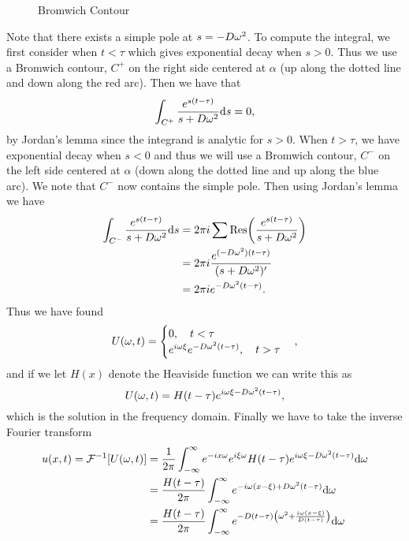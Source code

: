 \documentclass[12pt]{report}
\begin{document}
\begin{solution}
\begin{enumerate}
\begin{figure}[H]
            \caption{Bromwich Contour}
        \end{figure}
        Note that there exists a simple pole at $s = - D{\omega}^2$. To compute the integral, we first consider when $t < \tau$ which gives exponential decay when $s > 0$. Thus we use a Bromwich contour, $C^+$ on the right side centered at $\alpha$ (up along the dotted line and down along the red arc). Then we have that
        \[ 
            \int_{C^+}  \frac{e^{s(t - \tau)}}{s + D{\omega}^2} {\mathrm{d}} s = 0,
        \]
        by Jordan's lemma since the integrand is analytic for $s>0$. When $t > \tau$, we have exponential decay when $s < 0$ and thus we will use a Bromwich contour, $C^-$ on the left side centered at $\alpha$ (down along the dotted line and up along the blue arc). We note that $C^-$ now contains the simple pole. Then using Jordan's lemma we have
        \begin{align*}
            \int_{C^-}  \frac{e^{s(t - \tau)}}{s + D{\omega}^2} {\mathrm{d}} s &= 2\pi i \sum \text{Res} {\left(\frac{e^{s(t - \tau)}}{s + D{\omega}^2}\right)}\\
            &= 2 \pi i \frac{e^{(-D{\omega}^2)(t - \tau)}}{(s + D {\omega}^2)'}\\
            &= 2 \pi i e^{-D{\omega}^2(t - \tau)}.
        \end{align*}
        Thus we have found
        \[ 
            U({\omega},t) = \begin{cases}
                0, \quad t< \tau\\
                e^{i{\omega}{\xi}}e^{-D{\omega}^2(t - \tau)},\quad t > \tau
            \end{cases},
        \]
        and if we let $H(x)$ denote the Heaviside function we can write this as
        \[ 
            U({\omega},t) = H(t-\tau)e^{i{\omega}{\xi} - D{\omega}^2(t - \tau)},
        \] 
        which is the solution in the frequency domain. Finally we have to take the inverse Fourier transform
        \begin{align*}
            u(x,t) = \F^{-1}[U(\w,t)] &= \frac{1}{2\pi} \int_{-\infty}^{\infty} e^{ - i x \w} e^{i\xi \w} H(t-\tau)e^{i\w\x - D\w^2(t - \tau)} \d\w\\
            &= \frac{H(t-\tau)}{2\pi} \int_{-\infty}^{\infty} e^{-i\w(x - \x) + D\w^2(t - \t)} \d\w\\
            &= \frac{H(t-\tau)}{2\pi} \int_{-\infty}^{\infty} e^{-D(t - \t)\paren{\w^2 + \frac{i \w(x - \x)}{D(t-\t)}}} \d\w\\

\end{align*}
\end{enumerate}
\end{solution}
\end{document}
